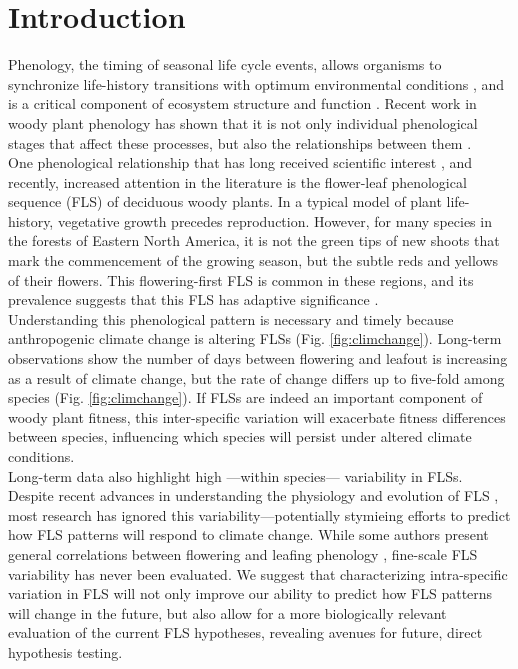 \documentclass{article}
\begin{document}
\section*{Introduction}
Phenology, the timing of seasonal life cycle events, allows organisms to synchronize life-history transitions with optimum environmental conditions \citep{Forrest2010}, and is a critical component of ecosystem structure and function \citep{Cleland2007,Piao2007}. Recent work in woody plant phenology has shown that it is not only individual phenological stages that affect these processes, but also the relationships between them \citep{Ettinger2018}.\\

\noindent One phenological relationship that has long received scientific interest \citep[see][]{Robertson1895}, and recently, increased attention in the literature \citep{Savage2019, Gougherty2018} is the flower-leaf phenological sequence (FLS) of deciduous woody plants. In a typical model of plant life-history, vegetative growth precedes reproduction. However, for many species in the forests of Eastern North America, it is not the green tips of new shoots that mark the commencement of the growing season, but the subtle reds and yellows of their flowers. This flowering-first FLS is common in these regions, and its prevalence suggests that this FLS has adaptive significance \citep{Rathcke_1985}.\\ 

\noindent Understanding this phenological pattern is necessary and timely because anthropogenic climate change is altering FLSs (Fig. \ref{fig:climchange}). Long-term observations show the number of days between flowering and leafout is increasing as a result of climate change, but the rate of change differs up to five-fold among species (Fig. \ref{fig:climchange}).  If FLSs are indeed an important component of woody plant fitness, this inter-specific variation will exacerbate fitness differences between species, influencing which species will persist under altered climate conditions.\\

\noindent Long-term data also highlight high ---within species--- variability in FLSs. Despite recent advances in understanding the physiology and evolution of FLS \citep{Gougherty2018,Savage2019}, most research has ignored this variability---potentially stymieing efforts to predict how FLS patterns will respond to climate change. While some authors present general correlations between flowering and leafing phenology \citep{Lechowicz_1995, Ettinger2018}, fine-scale FLS variability has never been evaluated. We suggest that characterizing intra-specific variation in FLS will not only improve our ability to predict how FLS patterns will change in the future, but also allow for a more biologically relevant evaluation of the current FLS hypotheses, revealing avenues for future, direct hypothesis testing.\\
\end{document}
